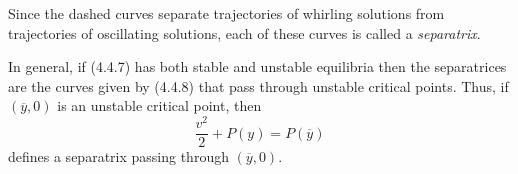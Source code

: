 \begin{example}
  Since the dashed curves separate trajectories of whirling solutions from trajectories of
  oscillating solutions, each of these curves is called a {\relax\it separatrix\/}.

  In general, if \textup{(4.4.7)} has both stable and unstable equilibria then the separatrices are
  the curves given by \textup{(4.4.8)} that pass through unstable critical points. Thus, if
  $(\overline{y},0)$ is an unstable critical point, then
  \begin{equation}
    \label{eq:4.4.17}\frac{v^{2}}{2}+P(y)=P(\overline{y})
  \end{equation}
  defines a separatrix passing through $(\overline{y},0)$.
\end{example}

\setcounter{example}{2}
\setcounter{equation}{21}
\setcounter{figure}{9}
